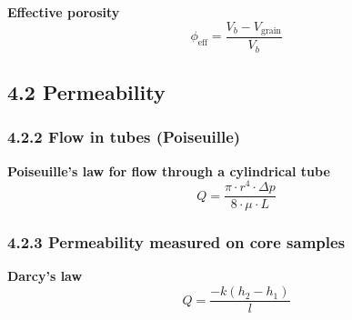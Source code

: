 \textbf{Effective porosity}
\begin{equation*}
    \phi_\mathrm{eff} = \frac{V_b - V_\mathrm{grain}}{V_b}\tag{4.6}
\end{equation*}

\subsection{4.2 Permeability}
\subsubsection{4.2.2 Flow in tubes (Poiseuille)}
\textbf{Poiseuille's law for flow through a cylindrical tube}
\begin{equation*}
    Q = \frac{\pi\cdot r^4\cdot\Delta p}{8\cdot\mu\cdot L}\tag{4.7}
\end{equation*}

\subsubsection{4.2.3 Permeability measured on core samples}
\textbf{Darcy's law}
\begin{equation*}
    Q = \frac{-k(h_2 - h_1)}{l}\tag{4.8}
\end{equation*}

